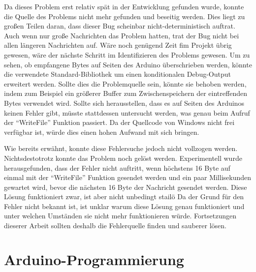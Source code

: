 Da dieses Problem erst relativ spät in der Entwicklung gefunden wurde, konnte die Quelle des Problems nicht mehr gefunden und beseitig werden.
Dies liegt zu großen Teilen daran, dass dieser Bug scheinbar nicht-deterministisch auftrat.
Auch wenn nur große Nachrichten das Problem hatten, trat der Bug nicht bei allen längeren Nachrichten auf.
Wäre noch genügend Zeit fim Projekt übrig gewesen, wäre der nächste Schritt im Identifizieren des Problems gewesen.
Um zu sehen, ob empfangene Bytes auf Seiten des Arduino überschrieben werden, könnte die verwendete Standard-Bibliothek um einen konditionalen Debug-Output erweitert werden.
Sollte dies die Problemquelle sein, könnte sie behoben werden, indem zum Beispiel ein größerer Buffer zum Zwischenspeichern der eintreffenden Bytes verwendet wird.
Sollte sich herausstellen, dass es auf Seiten des Arduinos keinen Fehler gibt, müsste stattdessen untersucht werden, was genau beim Aufruf der \enquote{WriteFile} Funktion passiert.
Da der Quellcode von Windows nicht frei verfügbar ist, würde dies einen hohen Aufwand mit sich bringen.

Wie bereits erwähnt, konnte diese Fehlersuche jedoch nicht vollzogen werden.
Nichtsdestotrotz konnte das Problem noch gelöst werden.
Experimentell wurde herausgefunden, dass der Fehler nicht auftritt, wenn höchstens 16 Byte auf einmal mit der \enquote{WriteFile} Funktion gesendet werden und ein paar Millisekunden gewartet wird, bevor die nächsten 16 Byte der Nachricht gesendet werden.
Diese Lösung funktioniert zwar, ist aber nicht unbedingt stailö
Da der Grund für den Fehler nicht bekannt ist, ist unklar warum diese Lösung genau funktioniert und unter welchen Umständen sie nicht mehr funktionieren würde.
Fortsetzungen dieserer Arbeit sollten deshalb die Fehlerquelle finden und sauberer lösen.


\section{Arduino-Programmierung} \label{umsetzungSW-MC}


